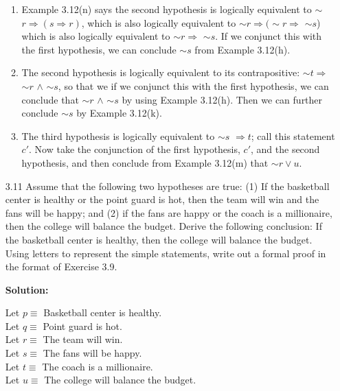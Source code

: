 \begin{enumerate}
      \begin{enumerate}
         \item Example 3.12(n) says the second hypothesis is logically 
               equivalent to $\sim$$r \Rightarrow (s \Rightarrow r)$, which is
               also logically equivalent to $\sim$$r \Rightarrow (\sim$$r 
               \Rightarrow$ $\sim$$s$) which is also logically equivalent to
               $\sim$$r \Rightarrow$ $\sim$$s$. If we conjunct this with the
               first hypothesis, we can conclude $\sim$$s$ from Example 3.12(h).
         \item The second hypothesis is logically equivalent to its 
               contrapositive: $\sim$$t \Rightarrow$ $\sim$$r$
               $\land$ $\sim$$s$, so that we if we conjunct this with the
               first hypothesis, we can conclude that
               $\sim$$r$ $\land$ $\sim$$s$ by using Example 3.12(h). Then we
               can further conclude $\sim$$s$ by Example 3.12(k).
         \item The third hypothesis is logically equivalent to $\sim$$s$
               $\Rightarrow t$; call this statement $c'$. Now take the 
               conjunction of the first hypothesis, $c'$, and the second 
               hypothesis, and then conclude from Example 3.12(m) that
               $\sim$$r \lor u$.
               
      \end{enumerate}
   \item[3.11] Assume that the following two hypotheses are true: (1) If the
               basketball center is healthy or the point guard is hot, then the
               team will win and the fans will be happy; and (2) if the fans are
               happy or the coach is a millionaire, then the college will 
               balance the budget. Derive the following conclusion: If the
               basketball center is healthy, then the college will balance the
               budget. Using letters to represent the simple statements, write
               out a formal proof in the format of Exercise 3.9.

      \textbf{Solution:}

      Let $p \equiv $ Basketball center is healthy. \\
      Let $q \equiv $ Point guard is hot. \\
      Let $r \equiv $ The team will win. \\
      Let $s \equiv $ The fans will be happy. \\
      Let $t \equiv $ The coach is a millionaire. \\
      Let $u \equiv $ The college will balance the budget. \\


\end{enumerate}
